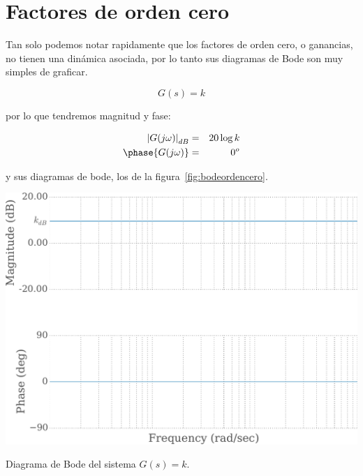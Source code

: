 
    \newpage
    \section{Factores de orden cero}
        Tan solo podemos notar rapidamente que los factores de orden cero, o ganancias, no tienen una dinámica asociada, por lo tanto sus diagramas de Bode son muy simples de graficar.

        \begin{equation*}
            G(s) = k
        \end{equation*}

        por lo que tendremos magnitud y fase:

        \begin{eqnarray*}
            \left| G(j \omega) \right|_{dB} & = & 20 \log{k} \\
            \phase{G(j \omega)} & = & 0^o
        \end{eqnarray*}

        y sus diagramas de bode, los de la figura~\ref{fig:bodeordencero}.

        \begin{marginfigure}
            \centering
            \includegraphics[width=\textwidth]{./imagenes/bodeordencero.pdf}
            \caption{\label{fig:bodeordencero}Diagrama de Bode del sistema $G(s) = k$.}
        \end{marginfigure}

